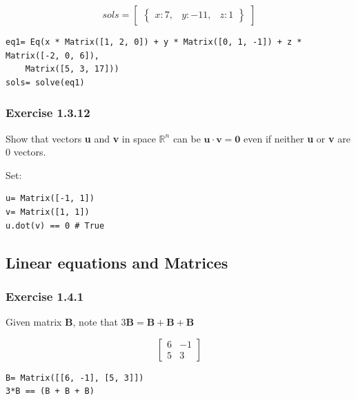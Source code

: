 \begin{equation}\label{eq:}
sols= \begin{bmatrix}\begin{Bmatrix}x : 7, & y : -11, & z : 1\end{Bmatrix}\end{bmatrix}
\end{equation}

\begin{verbatim}
eq1= Eq(x * Matrix([1, 2, 0]) + y * Matrix([0, 1, -1]) + z * Matrix([-2, 0, 6]),
    Matrix([5, 3, 17]))
sols= solve(eq1)
\end{verbatim}

\subsubsection{Exercise 1.3.12}

Show that vectors \textbf{u} and \textbf{v} in space $\mathbb{R}^n$ can be
$\mathbf{u} \cdot{} \mathbf{v} = \mathbf{0}$ even if neither \textbf{u} or \textbf{v}
are 0 vectors.

Set:

\begin{verbatim}
u= Matrix([-1, 1])
v= Matrix([1, 1])
u.dot(v) == 0 # True
\end{verbatim}

\subsection{Linear equations and Matrices}

\subsubsection{Exercise 1.4.1}

Given matrix \textbf{B}, note that $3\mathbf{B} = \mathbf{B} + \mathbf{B} + \mathbf{B}$

\begin{equation}
\left[\begin{matrix}6 & -1\\5 & 3\end{matrix}\right]
\end{equation}

\begin{verbatim}
B= Matrix([[6, -1], [5, 3]])
3*B == (B + B + B)
\end{verbatim}


